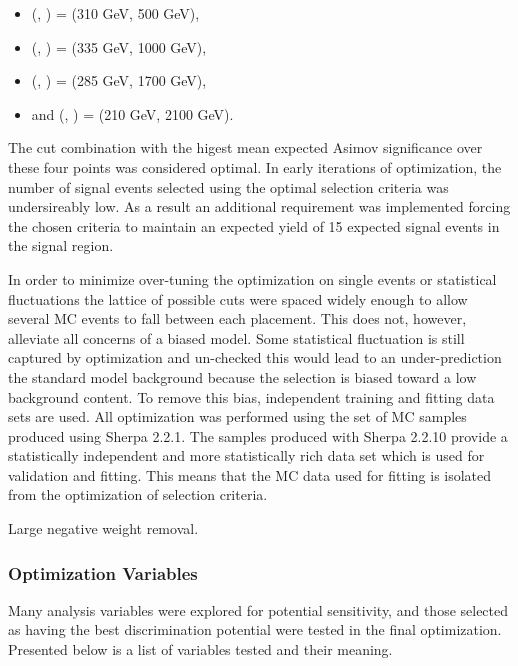 \begin{itemize}
  \item (\ms, \mZp) = (310 GeV, 500 GeV),
  \item (\ms, \mZp) = (335 GeV, 1000 GeV),
  \item (\ms, \mZp) = (285 GeV, 1700 GeV),
  \item and (\ms, \mZp) = (210 GeV, 2100 GeV).
\end{itemize}

The cut combination with the higest mean expected Asimov significance over these four points was considered optimal. In early iterations of optimization, the number of signal events selected using the optimal selection criteria was undersireably low. As a result an additional requirement was implemented forcing the chosen criteria to maintain an expected yield of 15 expected signal events in the \merged signal region.

In order to minimize over-tuning the optimization on single events or statistical fluctuations the lattice of possible cuts were spaced widely enough to allow several MC events to fall between each placement. This does not, however, alleviate all concerns of a biased model. Some statistical fluctuation is still captured by optimization and un-checked this would lead to an under-prediction the standard model background because the selection is biased toward a low background content. To remove this bias, independent training and fitting data sets are used. All optimization was performed using the set of MC samples produced using Sherpa 2.2.1. The samples produced with Sherpa 2.2.10 provide a statistically independent and more statistically rich data set which is used for validation and fitting. This means that the MC data used for fitting is isolated from the optimization of selection criteria.

Large negative weight removal.

\subsubsection{Optimization Variables}
Many analysis variables were explored for potential sensitivity, and those selected as having the best discrimination potential were tested in the final optimization. Presented below is a list of variables tested and their meaning.

